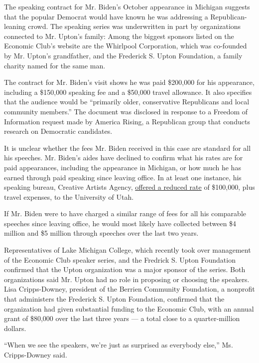 The speaking contract for Mr. Biden's October appearance in Michigan
suggests that the popular Democrat would have known he was addressing a
Republican-leaning crowd. The speaking series was underwritten in part
by organizations connected to Mr. Upton's family: Among the biggest
sponsors listed on the Economic Club's website are the Whirlpool
Corporation, which was co-founded by Mr. Upton's grandfather, and the
Frederick S. Upton Foundation, a family charity named for the same man.

The contract for Mr. Biden's visit shows he was paid \$200,000 for his
appearance, including a \$150,000 speaking fee and a \$50,000 travel
allowance. It also specifies that the audience would be ``primarily
older, conservative Republicans and local community members.'' The
document was disclosed in response to a Freedom of Information request
made by America Rising, a Republican group that conducts research on
Democratic candidates.

It is unclear whether the fees Mr. Biden received in this case are
standard for all his speeches. Mr. Biden's aides have declined to
confirm what his rates are for paid appearances, including the
appearance in Michigan, or how much he has earned through paid speaking
since leaving office. In at least one instance, his speaking bureau,
Creative Artists Agency,
\href{https://www.nytimes3xbfgragh.onion/2019/01/01/us/politics/joe-biden-presidential-campaign-2020.html}{offered
a reduced rate} of \$100,000, plus travel expenses, to the University of
Utah.

If Mr. Biden were to have charged a similar range of fees for all his
comparable speeches since leaving office, he would most likely have
collected between \$4 million and \$5 million through speeches over the
last two years.

Representatives of Lake Michigan College, which recently took over
management of the Economic Club speaker series, and the Fredrick S.
Upton Foundation confirmed that the Upton organization was a major
sponsor of the series. Both organizations said Mr. Upton had no role in
proposing or choosing the speakers. Lisa Cripps-Downey, president of the
Berrien Community Foundation, a nonprofit that administers the Frederick
S. Upton Foundation, confirmed that the organization had given
substantial funding to the Economic Club, with an annual grant of
\$80,000 over the last three years --- a total close to a
quarter-million dollars.

``When we see the speakers, we're just as surprised as everybody else,''
Ms. Cripps-Downey said.


